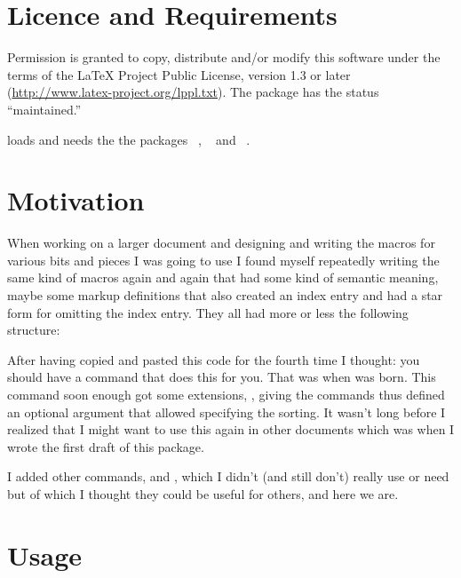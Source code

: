 \documentclass{cnpkgdoc}
\begin{document}
\section{Licence and Requirements}\label{sec:license}
Permission is granted to copy, distribute and/or modify this software under
the terms of the \LaTeX{} Project Public License, version 1.3 or later
(\url{http://www.latex-project.org/lppl.txt}). The package has the status
``maintained.''

\idxcmds loads and needs the the packages ~\cite{pkg:etoolbox},
~\cite{pkg:pgfopts} and ~\cite{pkg:ltxcmds}.

\section{Motivation}
When working on a larger document and designing and writing the macros for
various bits and pieces I was going to use I found myself repeatedly writing
the same kind of macros again and again that had some kind of semantic
meaning, maybe some markup definitions that also created an index entry and
had a star form for omitting the index entry.  They all had more or less the
following structure:

\begin{beispiel}
 \makeatletter
 \newcommand*\cmd{\@ifstar\cmd@star\cmd@nostar}
 \newcommand*\cmd@star[1]{\cmd@base{#1}}
 \newcommand*\cmd@nostar[1]{\cmd@base{#1}\cmd@idx{#1}}
 \newcommand*\cmd@base[1]{\textit{#1}}
 \newcommand*\cmd@idx[1]{\index{#1@\cmd@base{#1}}}
 \makeatother
\end{beispiel}

After having copied and pasted this code for the fourth time I thought: you
should have a command that does this for you.  That was when 
was born.  This command soon enough got some extensions, \eg, giving
the commands thus defined an optional argument that allowed specifying the
sorting.  It wasn't long before I realized that I might want to use this
 again in other documents which was when I wrote the first
draft of this package.

I added other commands,  and , which I
didn't (and still don't) really use or need but of which I thought they could
be useful for others, and here we are.

\section{Usage}\label{sec:usage}
\end{document}
